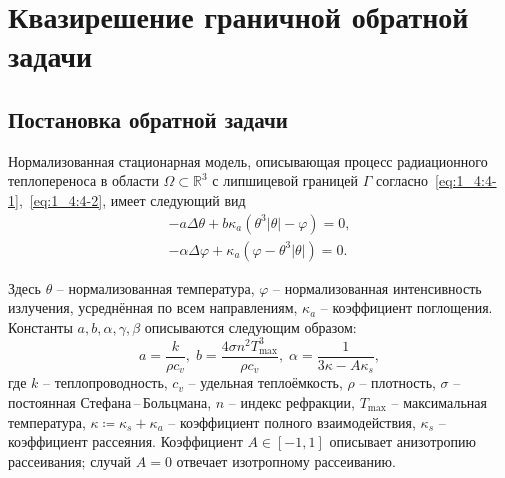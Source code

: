 \section{Квазирешение граничной обратной задачи}\label{sec:ch2/sec1}

\subsection{Постановка обратной задачи}\label{subsec:ch2/sec1/subsec1}

Нормализованная стационарная модель, описывающая процесс радиационного теплопереноса в
области $\Omega \subset \mathbb{R}^3$ с липшицевой границей $\Gamma$
согласно~\eqref{eq:1_4:4-1},~\eqref{eq:1_4:4-2}, имеет следующий вид
\begin{equation}
    \label{eq:2_1:initial}
    \begin{aligned}
        - a \Delta \theta + b \kappa_a(\theta ^ 3 | \theta | - \varphi) = 0,  \\
        - \alpha \Delta \varphi + \kappa_a (\varphi - \theta ^3 | \theta |) = 0.
    \end{aligned}
\end{equation}

Здесь $\theta$ -- нормализованная температура, $\varphi$ -- нормализованная интенсивность излучения,
усреднённая по всем направлениям, $\kappa_a$ -- коэффициент поглощения.
Константы $a, b, \alpha, \gamma, \beta$ описываются следующим образом:
\[
    a = \frac{k}{\rho c_v}, \; b = \frac{4 \sigma n^2 T^3_{\max}}{\rho c_v}, \;
    \alpha = \frac{1}{3\kappa -A \kappa_s},
\]
где $k$ -- теплопроводность, $c_v$ -- удельная теплоёмкость, $\rho$ -- плотность,
$\sigma$ -- постоянная Стефана\,--\,Больцмана, $n$ -- индекс рефракции,
$T_{\max}$ -- максимальная температура,
$\kappa \coloneqq \kappa_s + \kappa_a$ -- коэффициент полного взаимодействия,
$\kappa_s$ -- коэффициент рассеяния.
Коэффициент $A \in [-1,1]$ описывает анизотропию рассеивания;
случай $A=0$ отвечает изотропному рассеиванию.

